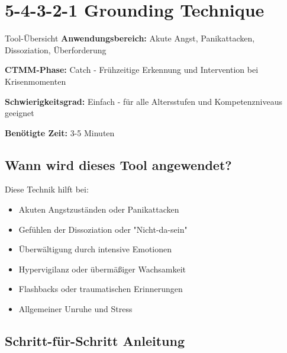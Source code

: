 % 

\section{5-4-3-2-1 Grounding Technique}

\begin{ctmmOrangeBox}{Tool-Übersicht}
\textbf{Anwendungsbereich:} Akute Angst, Panikattacken, Dissoziation, Überforderung

\textbf{CTMM-Phase:} Catch - Frühzeitige Erkennung und Intervention bei Krisenmomenten

\textbf{Schwierigkeitsgrad:} Einfach - für alle Altersstufen und Kompetenzniveaus geeignet

\textbf{Benötigte Zeit:} 3-5 Minuten
\end{ctmmOrangeBox}

\subsection{Wann wird dieses Tool angewendet?}

Diese Technik hilft bei:
\begin{itemize}
\item Akuten Angstzuständen oder Panikattacken
\item Gefühlen der Dissoziation oder "Nicht-da-sein"
\item Überwältigung durch intensive Emotionen
\item Hypervigilanz oder übermäßiger Wachsamkeit
\item Flashbacks oder traumatischen Erinnerungen
\item Allgemeiner Unruhe und Stress
\end{itemize}

\subsection{Schritt-für-Schritt Anleitung}

